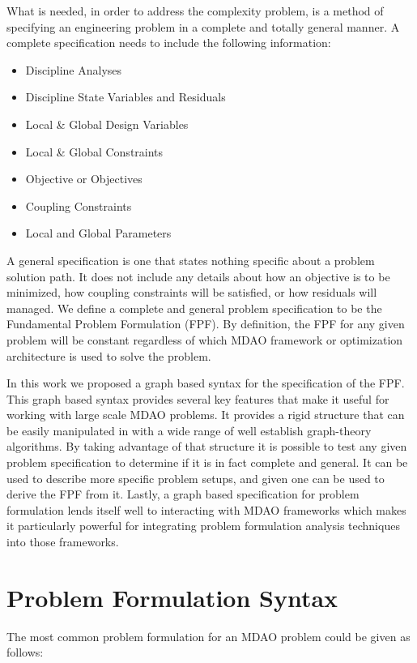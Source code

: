 \documentclass[]{aiaa-tc} %
\begin{document}
    What is needed, in order to address the complexity problem, is a method of specifying an engineering problem 
    in a complete and totally general manner. A complete specification needs to include the following information: 
    \begin{itemize}
       \item Discipline Analyses 
       \item Discipline State Variables and Residuals
       \item Local \& Global Design Variables
       \item Local \& Global Constraints
       \item Objective or Objectives
       \item Coupling Constraints
       \item Local and Global Parameters
    \end{itemize}
    A general specification is one that states nothing specific about a problem solution path. It does not include any details about 
    how an objective is to be minimized, how coupling constraints will be satisfied, or how residuals will managed. We 
    define a complete and general problem specification to be the Fundamental Problem Formulation (FPF). By definition, the FPF for 
    any given problem will be constant regardless of which MDAO framework or optimization architecture is used to solve the problem. 

    In this work we proposed a graph based syntax for the specification of the FPF. This graph based syntax provides several key
    features that make it useful for working with large scale MDAO problems. It provides a rigid structure that can be easily manipulated 
    in with a wide range of well establish graph-theory algorithms. By taking advantage of that structure it is possible to test 
    any given problem specification to determine if it is in fact complete and general. It can be used to describe more specific problem 
    setups, and given one can be used to derive the FPF from it. Lastly, a graph based specification for problem formulation lends itself
    well to interacting with MDAO frameworks which makes it particularly powerful for integrating problem formulation analysis techniques 
    into those frameworks. 


\section{Problem Formulation Syntax}
    The most common problem formulation for an MDAO problem could be given as follows: 
\end{document}
